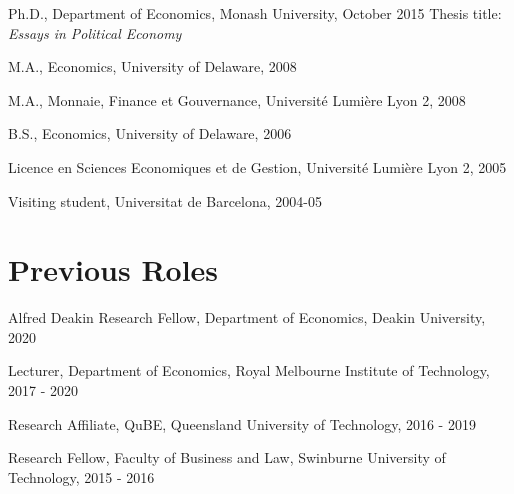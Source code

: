\documentclass[letterpaper]{article}
\renewenvironment{itemize}{
  \begin{list}{}{
    \setlength{\leftmargin}{1.5em}
  }
}{
  \end{list}
}
\begin{document}
\begin{itemize}
	\item Ph.D., Department of Economics, Monash University, October 2015
	\subitem Thesis title: {\emph{Essays in Political Economy}}
	\item M.A., Economics, University of Delaware, 2008 
	\item M.A., Monnaie, Finance et Gouvernance, Universit\'e Lumi\`ere Lyon 2, 2008
	\item B.S., Economics, University of Delaware, 2006
	\item Licence en Sciences Economiques et de Gestion, Universit\'e Lumi\`ere Lyon 2, 2005
	\item Visiting student, Universitat de Barcelona, 2004-05
\end{itemize}

\section*{ Previous Roles}

\begin{itemize}
	
	\item Alfred Deakin Research Fellow, Department of Economics, Deakin University, 2020
	
	\item Lecturer, Department of Economics, Royal Melbourne Institute of Technology, 2017 - 2020
	
	
	
	\item Research Affiliate, QuBE, Queensland University of Technology, 2016 - 2019
	
	\item Research Fellow, Faculty of Business and Law, Swinburne University of Technology, 2015 - 2016
	
\end{itemize}
\end{document}
